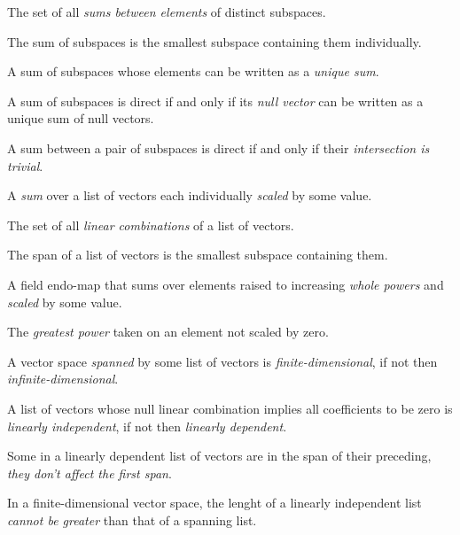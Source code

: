 \begin{multicols}{3}
  The set of all \textit{sums between elements} of distinct subspaces.
  
  The sum of subspaces is the smallest subspace containing them individually.
  
  A sum of subspaces whose elements can be written as a \textit{unique sum}.
  
  A sum of subspaces is direct if and only if its \textit{null vector} can be written as a unique sum of null vectors.

  A sum between a pair of subspaces is direct if and only if their \textit{intersection is trivial}.

  A \textit{sum} over a list of vectors each individually \textit{scaled} by some value.
  
  The set of all \textit{linear combinations} of a list of vectors.
  
  The span of a list of vectors is the smallest subspace containing them.

  A field endo-map that sums over elements raised to increasing \textit{whole powers} and \textit{scaled} by some value.
  
  The \textit{greatest power} taken on an element not scaled by zero.
  
  A vector space \textit{spanned} by some list of vectors is \textit{finite-dimensional}, if not then \textit{infinite-dimensional}.
  
  A list of vectors whose null linear combination implies all coefficients to be zero is \textit{linearly independent},
  if not then \textit{linearly dependent}.

  Some in a linearly dependent list of vectors are in the span of their preceding, \textit{they don't affect the first span}.
  
  In a finite-dimensional vector space, the lenght of a linearly independent list \textit{cannot be greater} than that of a spanning list.
  

\end{multicols}
